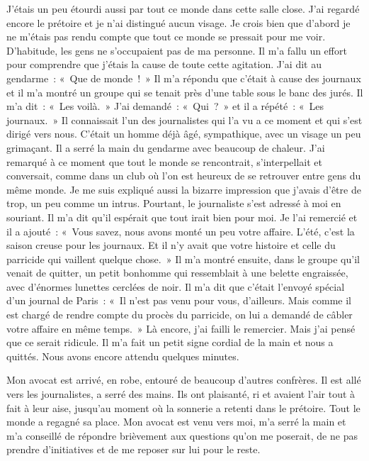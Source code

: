 \documentclass[french,twoside]{book} %
\begin{document}
J'étais un peu étourdi aussi par tout ce monde dans cette salle close. J'ai regardé encore le prétoire et je n’ai distingué aucun visage. Je crois bien que d’abord je ne m’étais pas rendu compte que tout ce monde se pressait pour me voir. D'habitude, les gens ne s’occupaient pas de ma personne. Il m’a fallu un effort pour comprendre que j’étais la cause de toute cette agitation. J'ai dit au gendarme : « Que de monde ! » Il m’a répondu que c’était à cause des journaux et il m’a montré un groupe qui se tenait près d’une table sous le banc des jurés. Il m’a dit : « Les voilà. » J'ai demandé : « Qui ? » et il a répété : « Les journaux. » Il connaissait l’un des journalistes qui l’a vu a ce moment et qui s’est dirigé vers nous. C'était un homme déjà âgé, sympathique, avec un visage un peu grimaçant. Il a serré la main du gendarme avec beaucoup de chaleur. J'ai remarqué à ce moment que tout le monde se rencontrait, s’interpellait et conversait, comme dans un club où l’on est heureux de se retrouver entre gens du même monde. Je me suis expliqué aussi la bizarre impression que j’avais d’être de trop, un peu comme un intrus. Pourtant, le journaliste s’est adressé à moi en souriant. Il m’a dit qu’il espérait que tout irait bien pour moi. Je l’ai remercié et il a ajouté : « Vous savez, nous avons monté un peu votre affaire. L'été, c’est la saison creuse pour les journaux. Et il n’y avait que votre histoire et celle du parricide qui vaillent quelque chose. » Il m’a montré ensuite, dans le groupe qu’il venait de quitter, un petit bonhomme qui ressemblait à une belette engraissée, avec d’énormes lunettes cerclées de noir. Il m’a dit que c’était l’envoyé spécial d’un journal de Paris : « Il n’est pas venu pour vous, d’ailleurs. Mais comme il est chargé de rendre compte du procès du parricide, on lui a demandé de câbler votre affaire en même temps. » Là encore, j’ai failli le remercier. Mais j’ai pensé que ce serait ridicule. Il m’a fait un petit signe cordial de la main et nous a quittés. Nous avons encore attendu quelques minutes.\par
Mon avocat est arrivé, en robe, entouré de beaucoup d’autres confrères. Il est allé vers les journalistes, a serré des mains. Ils ont plaisanté, ri et avaient l’air tout à fait à leur aise, jusqu’au moment où la sonnerie a retenti dans le prétoire. Tout le monde a regagné sa place. Mon avocat est venu vers moi, m’a serré la main et m’a conseillé de répondre brièvement aux questions qu’on me poserait, de ne pas prendre d’initiatives et de me reposer sur lui pour le reste.\par
\end{document}
